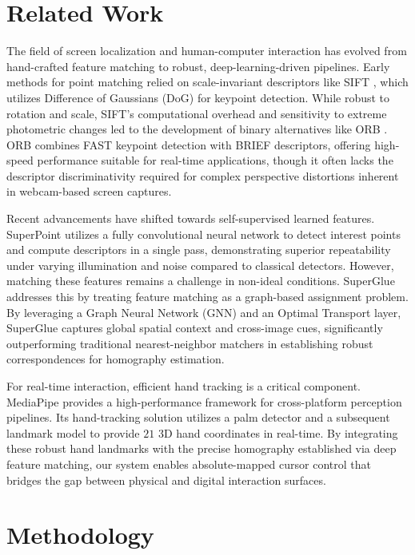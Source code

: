 \documentclass[conference]{IEEEtran}
\begin{document}
\section{Related Work}

The field of screen localization and human-computer interaction has evolved from hand-crafted feature matching to robust, deep-learning-driven pipelines. Early methods for point matching relied on scale-invariant descriptors like SIFT \cite{lowe2004distinctive}, which utilizes Difference of Gaussians (DoG) for keypoint detection. While robust to rotation and scale, SIFT's computational overhead and sensitivity to extreme photometric changes led to the development of binary alternatives like ORB \cite{rublee2011orb}. ORB combines FAST keypoint detection with BRIEF descriptors, offering high-speed performance suitable for real-time applications, though it often lacks the descriptor discriminativity required for complex perspective distortions inherent in webcam-based screen captures.

Recent advancements have shifted towards self-supervised learned features. SuperPoint \cite{detone2018superpoint} utilizes a fully convolutional neural network to detect interest points and compute descriptors in a single pass, demonstrating superior repeatability under varying illumination and noise compared to classical detectors. However, matching these features remains a challenge in non-ideal conditions. SuperGlue \cite{sarlin2020superglue} addresses this by treating feature matching as a graph-based assignment problem. By leveraging a Graph Neural Network (GNN) and an Optimal Transport layer, SuperGlue captures global spatial context and cross-image cues, significantly outperforming traditional nearest-neighbor matchers in establishing robust correspondences for homography estimation.

For real-time interaction, efficient hand tracking is a critical component. MediaPipe \cite{lugaresi2019mediapipe} provides a high-performance framework for cross-platform perception pipelines. Its hand-tracking solution utilizes a palm detector and a subsequent landmark model to provide $21$ 3D hand coordinates in real-time. By integrating these robust hand landmarks with the precise homography established via deep feature matching, our system enables absolute-mapped cursor control that bridges the gap between physical and digital interaction surfaces.

\section{Methodology}
\end{document}
